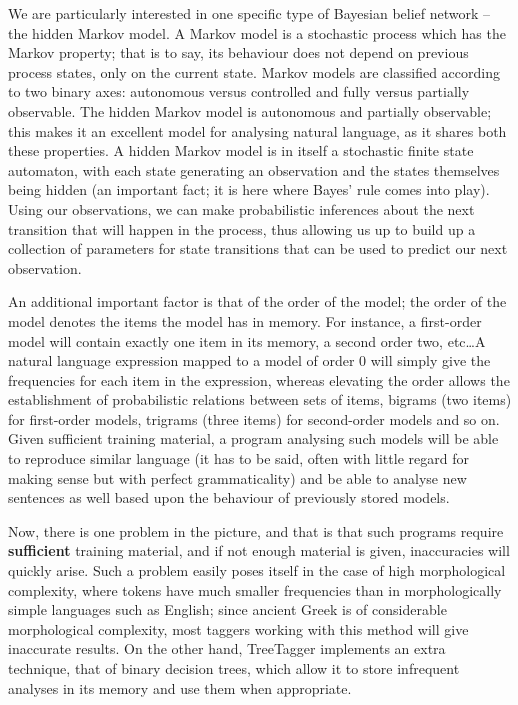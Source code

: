 We are particularly interested in one specific type of Bayesian belief network
-- the hidden Markov model. A Markov model is a stochastic process which has
the Markov property; that is to say, its behaviour does not depend on previous
process states, only on the current state. Markov models are classified
according to two binary axes: autonomous versus controlled and fully versus
partially observable. The hidden Markov model is autonomous and partially
observable; this makes it an excellent model for analysing natural language, as
it shares both these properties. A hidden Markov model is in itself a
stochastic finite state automaton, with each state generating an observation
and the states themselves being hidden (an important fact; it is here where
Bayes' rule comes into play). Using our observations, we can make probabilistic
inferences about the next transition that will happen in the process, thus
allowing us up to build up a collection of parameters for state transitions
that can be used to predict our next observation.

An additional important factor is that of the order of the model; the order of
the model denotes the items the model has in memory. For instance, a
first-order model will contain exactly one item in its memory, a second order
two, etc\ldots A natural language expression mapped to a model of order 0 will
simply give the frequencies for each item in the expression, whereas elevating
the order allows the establishment of probabilistic relations between sets of
items, bigrams (two items) for first-order models, trigrams (three items) for
second-order models and so on. Given sufficient training material, a program
analysing such models will be able to reproduce similar language (it has to be
said, often with little regard for making sense but with perfect
grammaticality) and be able to analyse new sentences as well based upon the
behaviour of previously stored models.

Now, there is one problem in the picture, and that is that such programs
require \textbf{sufficient} training material, and if not enough material is
given, inaccuracies will quickly arise. Such a problem easily poses itself in
the case of high morphological complexity, where tokens have much smaller
frequencies than in morphologically simple languages such as English; since
ancient Greek is of considerable morphological complexity, most taggers working
with this method will give inaccurate results. On the other hand, TreeTagger
implements an extra technique, that of binary decision trees, which allow it to
store infrequent analyses in its memory and use them when appropriate.

